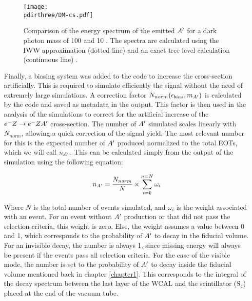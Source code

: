\begin{figure}[htb!]
  \centering
  \texttt{[image: \\pdirthree/DM-cs.pdf]}
  \caption[IWW vs tree-level energy spectra]{Comparison of the energy spectrum of the emitted $A'$ for a dark photon mass of 100 \mev and 10 \mev. The spectra are calculated using the IWW approximation (dotted line) and an exact tree-level calculation (continuous line) \cite{DMsimulation}.}
  \label{fig:dm-iww-tl}
\end{figure}


Finally, a biasing system was added to the code to increase the cross-section artificially. This is required to simulate efficiently the signal without the need of extremely large simulations. A correction factor $N_{norm}(\epsilon_{bias},m_{A'})$ is calculated by the code and saved as metadata in the output. This factor is then used in the analysis of the simulations to correct for the artificial increase of the $e^- Z \to e^- Z A'$ cross-section. The number of $A'$ simulated scales linearly with $N_{norm}$, allowing a quick correction of the signal yield. The most relevant number for this is the expected number of $A'$ produced normalized to the total EOTs, which we will call $n_{A'}$. This can be calculated simply from the output of the simulation using the following equation:

\begin{equation}
  \label{eq:1}
  n_{A'} = \frac{N_{norm}}{N} \times \sum^{n=N}_{i=0} \omega_i
\end{equation}

Where $N$ is the total number of events simulated, and $\omega_i$ is the weight associated with an event. For an event without $A'$ production or that did not pass the selection criteria, this weight is zero. Else, the weight assumes a value between 0 and 1, which corresponds to the probability of $A'$ to decay in the fiducial volume. For an invisible decay, the number is always 1, since missing energy will always be present if the events pass all selection criteria. For the case of the visible mode, the number is set to the probability of $A'$ to decay inside the fiducial volume mentioned back in chapter \ref{chapter1}. This corresponds to the integral of the decay spectrum between the last layer of the WCAL and the scintillator (S$_4$) placed at the end of the vacuum tube.

